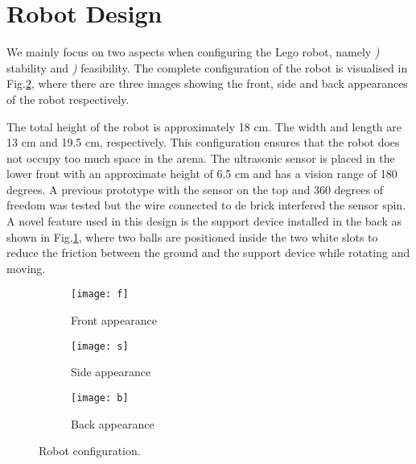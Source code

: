 \section{Robot Design}
We mainly focus on two aspects when configuring the Lego robot, namely {\itshape {})} stability and {\itshape {})} feasibility. The complete configuration of the robot is visualised in Fig.\ref{fig:robotconfig}, where there are three images showing the front, side and back appearances of the robot respectively. 

The total height of the robot is approximately 18 cm. The width and length are 13 cm and 19.5 cm, respectively. This configuration ensures that the robot does not occupy too much space in the arena. The ultrasonic sensor is placed in the lower front with an approximate height of 6.5 cm and has a vision range of 180 degrees. A previous prototype with the sensor on the top and 360 degrees of freedom was tested but the wire connected to de brick interfered the sensor spin. A novel feature used in this design is the support device installed in the back as shown in Fig.\ref{fig:backrobot}, where two balls are positioned inside the two white slots to reduce the friction between the ground and the support device while rotating and moving. 

\begin{figure}[h]
\centering
  \begin{subfigure}{0.25\textwidth}
  \texttt{[image: f]}
  \caption{Front appearance}
  \end{subfigure}
  \begin{subfigure}{0.25\textwidth}
  \texttt{[image: s]}
  \caption{Side appearance}
  \end{subfigure}
  \begin{subfigure}{0.25\textwidth}
  \texttt{[image: b]}
  \caption{Back appearance} \label{fig:backrobot}
  \end{subfigure}
  \caption{Robot configuration.}
  \label{fig:robotconfig}
\end{figure}

\FloatBarrier
